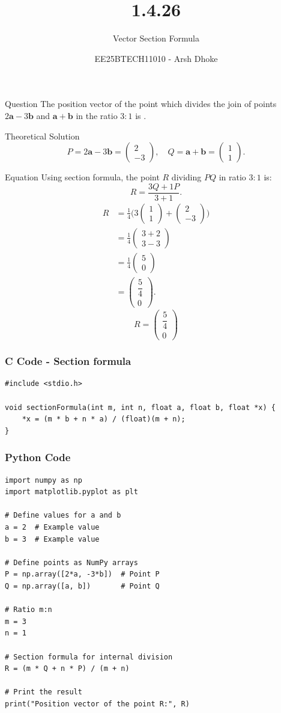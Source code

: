 \documentclass{beamer}
\title{1.4.26}
\subtitle{Vector Section Formula}
\author{EE25BTECH11010 - Arsh Dhoke}
\date{}
\renewcommand{\vec}[1]{\mathbf{#1}}
\newcommand{\brak}[1]{\begin{pmatrix}#1\end{pmatrix}}
\begin{document}
\begin{frame}
\titlepage
\end{frame}

\begin{frame}{Question}
The position vector of the point which divides the join of points 
$2\vec{a} - 3\vec{b}$  and  $\vec{a} + \vec{b}$
in the ratio $3:1$ is \underline{\hspace{2cm}}.
\end{frame}

\begin{frame}{Theoretical Solution}
\[
P = 2\vec a - 3\vec b = \brak{2\\-3}, \quad 
Q = \vec a + \vec b = \brak{1\\1}.
\]
\end{frame}

\begin{frame}{Equation}
Using section formula,
the point $R$ dividing $PQ$ in ratio $3:1$ is:
\[
R=\frac{3Q+1P}{3+1}.
\]
\begin{align*}
R &= \frac{1}{4}\Big(3\brak{1\\1}+\brak{2\\-3}\Big) \\
  &= \frac{1}{4}\brak{3+2\\3-3} \\
  &= \frac{1}{4}\brak{5\\0} \\
  &= \brak{\dfrac{5}{4}\\0}.
\end{align*}
\[
\boxed{R=\brak{\dfrac{5}{4}\\0}}
\]
\end{frame}

\begin{frame}[fragile]
    \frametitle{C Code - Section formula}

    \begin{lstlisting}
#include <stdio.h>

void sectionFormula(int m, int n, float a, float b, float *x) {
    *x = (m * b + n * a) / (float)(m + n);
}

    \end{lstlisting}
\end{frame}

\begin{frame}[fragile]
    \frametitle{Python Code}

    \begin{lstlisting}
import numpy as np
import matplotlib.pyplot as plt

# Define values for a and b
a = 2  # Example value
b = 3  # Example value

# Define points as NumPy arrays
P = np.array([2*a, -3*b])  # Point P
Q = np.array([a, b])       # Point Q

# Ratio m:n
m = 3
n = 1

# Section formula for internal division
R = (m * Q + n * P) / (m + n)

# Print the result
print("Position vector of the point R:", R)

    \end{lstlisting}
\end{frame}
\end{document}
